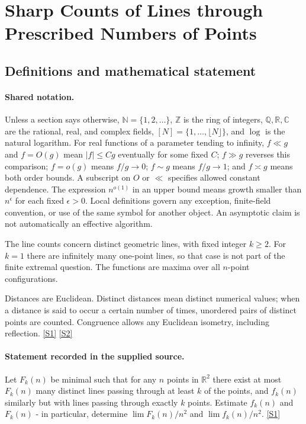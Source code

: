 \documentclass[11pt,a4paper]{article}
\newcommand{\N}{\mathbb{N}}
\newcommand{\Z}{\mathbb{Z}}
\newcommand{\Q}{\mathbb{Q}}
\newcommand{\R}{\mathbb{R}}
\newcommand{\C}{\mathbb{C}}
\newcommand{\sref}[2]{\hyperlink{source:#1:#2}{[S#2]}}
\begin{document}
\section{Sharp Counts of Lines through Prescribed Numbers of Points}\label{statement}


\subsection{Definitions and mathematical statement}

\paragraph{Shared notation.}Unless a section says otherwise, $\N=\{1,2,\ldots\}$,
$\Z$ is the ring of integers, $\Q,\R,\C$ are the rational, real, and complex
fields, $[N]=\{1,\ldots,\lfloor N\rfloor\}$, and $\log$ is the natural
logarithm. For real functions of a parameter tending to infinity,
$f\ll g$ and $f=O(g)$ mean $|f|\leq Cg$ eventually for some fixed $C$;
$f\gg g$ reverses this comparison; $f=o(g)$ means $f/g\to0$;
$f\sim g$ means $f/g\to1$; and $f\asymp g$ means both order bounds.
A subscript on $O$ or $\ll$ specifies allowed constant dependence.
The expression $n^{o(1)}$ in an upper bound means growth smaller than
$n^\epsilon$ for each fixed $\epsilon>0$. Local definitions govern any
exception, finite-field convention, or use of the same symbol for another
object. An asymptotic claim is not automatically an effective algorithm.



The line counts concern distinct geometric lines, with fixed integer $k\geq2$. For $k=1$ there are infinitely many one-point lines, so that case is not part of the finite extremal question. The functions are maxima over all $n$-point configurations.

Distances are Euclidean. Distinct distances mean distinct numerical values; when a distance is said to occur a certain number of times, unordered pairs of distinct points are counted. Congruence allows any Euclidean isometry, including reflection. \sref{statement}{1} \sref{statement}{2}

\paragraph{Statement recorded in the supplied source.}
Let $F_k(n)$ be minimal such that for any $n$ points in $\mathbb{R}^2$ there exist at most $F_k(n)$ many distinct lines passing through at least $k$ of the points, and $f_k(n)$ similarly but with lines passing through exactly $k$ points.
Estimate $f_k(n)$ and $F_k(n)$ - in particular, determine $\lim F_k(n)/n^2$ and $\lim f_k(n)/n^2$. \sref{statement}{1}
\end{document}
